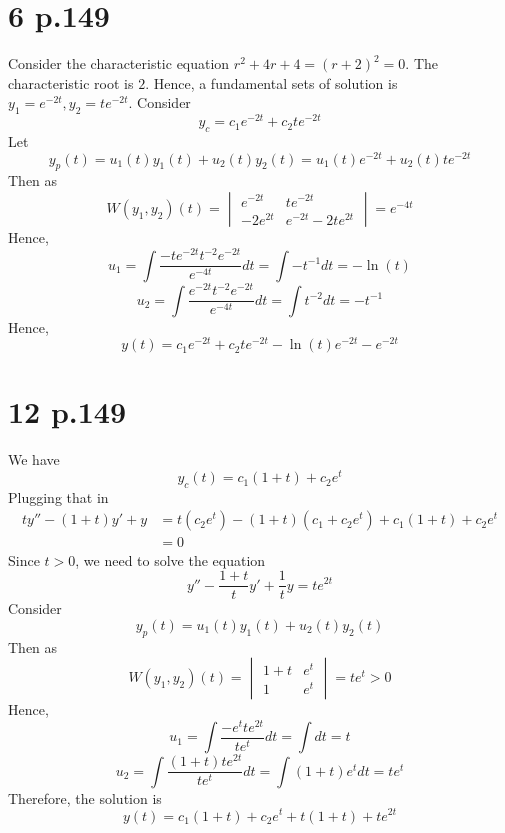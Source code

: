 \documentclass[11pt]{article}
\begin{document}
\section*{6 p.149}
Consider the characteristic equation $r^2+4r+4= (r+2)^2 = 0$. The characteristic root is $2$.
Hence, a fundamental sets of solution is $y_1 = e^{-2t}, y_2 = te^{-2t}$. 
Consider 
\[
    y_c = c_1e^{-2t} + c_2te^{-2t}    
\]
Let 
\[
    y_p(t) = u_1(t)y_1(t) + u_2(t)y_2(t) = u_1(t) e^{-2t} + u_2(t)te^{-2t}    
\]
Then as 
\[
    W(y_1,y_2)(t) = 
    \begin{vmatrix}
        e^{-2t} & te^{-2t} \\
        -2e^{2t} & e^{-2t} - 2te^{2t}
    \end{vmatrix} = e^{-4t}
\]
Hence, 
\[
    u_1 = \int \frac{-te^{-2t} t^{-2}e^{-2t}}{e^{-4t}} dt = \int -t^{-1} dt =    -\ln(t)
\]
\[
    u_2 = \int \frac{e^{-2t} t^{-2}e^{-2t}}{e^{-4t}} dt = \int t^{-2} dt = -t^{-1}
\]
Hence, 
\[
    y(t) = c_1e^{-2t} + c_2te^{-2t} -\ln(t)e^{-2t} - e^{-2t}
\]
\newpage
\section*{12 p.149}
We have 
\[
    y_c(t) = c_1(1+t) + c_2e^t    
\]
Plugging that in 
\begin{equation*}
    \begin{aligned}
        ty'' - (1+t)y' + y &= t(c_2e^t) -(1+t)(c_1 + c_2e^t) + c_1(1+t)+c_2e^t \\
        &= 0 
    \end{aligned}
\end{equation*}
Since $t>0$, we need to solve the equation 
\[
    y'' - \frac{1+t}{t}y' + \frac{1}{t}y = te^{2t}    
\]
Consider 
\[y_p(t) = u_1(t) y_1(t) + u_2(t)y_2(t)\]
Then as 
\[
    W(y_1,y_2)(t) = 
    \begin{vmatrix}
        1+t & e^t \\
        1 & e^t
    \end{vmatrix} = te^t > 0
\]
Hence, 
\[
    u_1 = \int \frac{-e^t te^{2t}}{te^t} dt = \int dt =  t
\]
\[
    u_2 = \int \frac{(1+t) te^{2t}}{te^t} dt = \int (1+t)e^t dt = te^t
\]
Therefore, the solution is 
\[
    y(t) =  c_1(1+t) + c_2e^t + t(1+t) + te^{2t}
\]
\newpage
\end{document}
